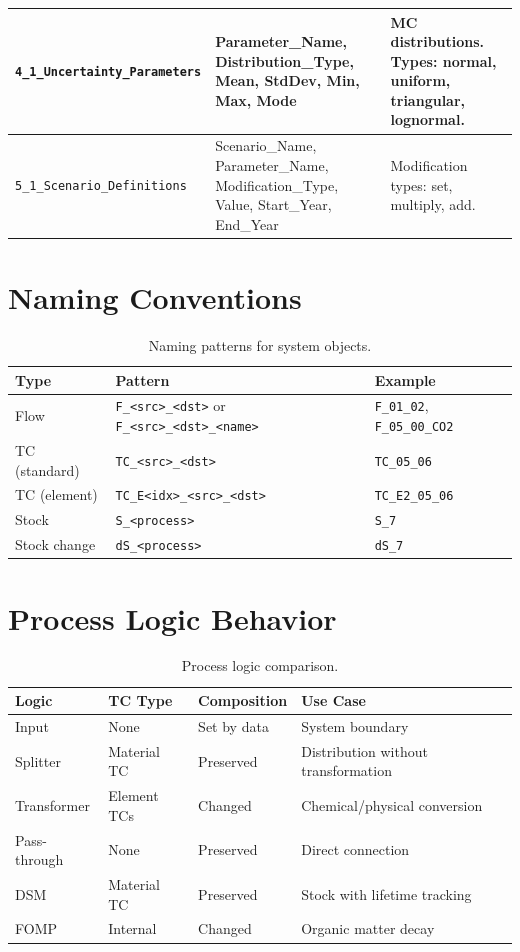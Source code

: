 \begin{longtable}{L{3.5cm}L{3cm}L{6.5cm}}
\texttt{4\_1\_Uncertainty\_Parameters} &
Parameter\_Name, Distribution\_Type, Mean, StdDev, Min, Max, Mode &
MC distributions. Types: normal, uniform, triangular, lognormal. \\
\midrule

\texttt{5\_1\_Scenario\_Definitions} &
Scenario\_Name, Parameter\_Name, Modification\_Type, Value, Start\_Year, End\_Year &
Modification types: set, multiply, add. \\

\bottomrule
\end{longtable}

\section{Naming Conventions}

\begin{table}[h]
\centering
\begin{tabular}{lll}
\toprule
\textbf{Type} & \textbf{Pattern} & \textbf{Example} \\
\midrule
Flow & \texttt{F\_<src>\_<dst>} or \texttt{F\_<src>\_<dst>\_<name>} & \texttt{F\_01\_02}, \texttt{F\_05\_00\_CO2} \\
TC (standard) & \texttt{TC\_<src>\_<dst>} & \texttt{TC\_05\_06} \\
TC (element) & \texttt{TC\_E<idx>\_<src>\_<dst>} & \texttt{TC\_E2\_05\_06} \\
Stock & \texttt{S\_<process>} & \texttt{S\_7} \\
Stock change & \texttt{dS\_<process>} & \texttt{dS\_7} \\
\bottomrule
\end{tabular}
\caption{Naming patterns for system objects.}
\end{table}

\section{Process Logic Behavior}

\begin{table}[h]
\centering
\begin{tabular}{L{2.5cm}L{2.5cm}L{2.5cm}L{4cm}}
\toprule
\textbf{Logic} & \textbf{TC Type} & \textbf{Composition} & \textbf{Use Case} \\
\midrule
Input & None & Set by data & System boundary \\
Splitter & Material TC & Preserved & Distribution without transformation \\
Transformer & Element TCs & Changed & Chemical/physical conversion \\
Pass-through & None & Preserved & Direct connection \\
DSM & Material TC & Preserved & Stock with lifetime tracking \\
FOMP & Internal & Changed & Organic matter decay \\
\bottomrule
\end{tabular}
\caption{Process logic comparison.}
\end{table}
